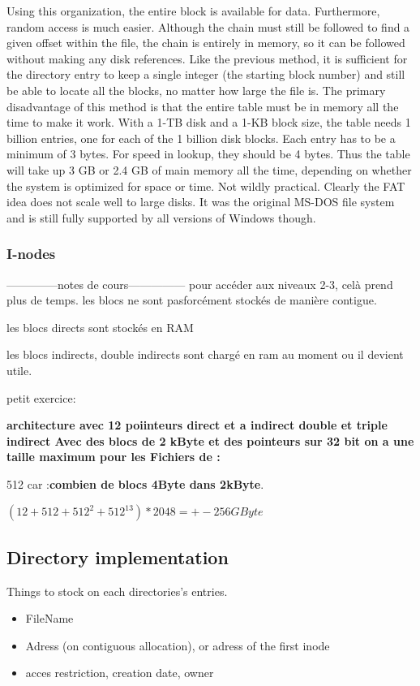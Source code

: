 Using this organization, the entire block is available for data. Furthermore, random
access is much easier. Although the chain must still be followed to find a
given offset within the file, the chain is entirely in memory, so it can be followed
without making any disk references. Like the previous method, it is sufficient for
the directory entry to keep a single integer (the starting block number) and still be
able to locate all the blocks, no matter how large the file is.
The primary disadvantage of this method is that the entire table must be in
memory all the time to make it work. With a 1-TB disk and a 1-KB block size, the
table needs 1 billion entries, one for each of the 1 billion disk blocks. Each entry
has to be a minimum of 3 bytes. For speed in lookup, they should be 4 bytes. Thus
the table will take up 3 GB or 2.4 GB of main memory all the time, depending on
whether the system is optimized for space or time. Not wildly practical. Clearly the
FAT idea does not scale well to large disks. It was the original MS-DOS file system
and is still fully supported by all versions of Windows though.

\newpage
\subsubsection{I-nodes}
--------------notes de cours---------------
pour accéder aux niveaux 2-3, celà prend plus de temps. les blocs ne sont pasforcément stockés
de manière contigue.

les blocs directs sont stockés en RAM

les blocs indirects, double indirects sont chargé en ram au moment ou il devient utile.

petit exercice:

\textbf{architecture avec 12 poiinteurs direct et a indirect double et triple indirect Avec des blocs de 2 kByte et des pointeurs sur 32 bit on a une taille maximum pour les Fichiers de :}

512 car :\textbf{combien de blocs 4Byte dans 2kByte}.


$(12+512+512^{2}+512^{13})*2048 = +-256GByte$



\newpage
\subsection{Directory implementation}
Things to stock on each directories's entries.
\begin{itemize}
    \item FileName
    \item Adress (on contiguous allocation), or adress of the first inode
    \item acces restriction, creation date, owner
\end{itemize}


